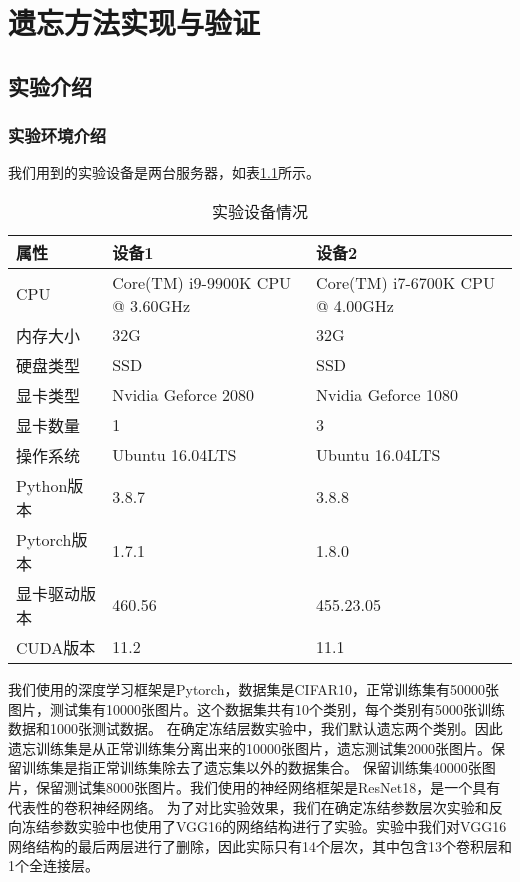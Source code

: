 
\chapter{遗忘方法实现与验证}

\section{实验介绍}

\subsection{实验环境介绍}
我们用到的实验设备是两台服务器，如表\ref{tab:experiment-deivce}所示。
\begin{table}
    \centering
    \caption{实验设备情况}
    \begin{tabular}{lll}
      \toprule
      属性  & 设备1 & 设备2  \\
      \midrule
      CPU   & Core(TM) i9-9900K CPU @ 3.60GHz & Core(TM) i7-6700K CPU @ 4.00GHz \\
      内存大小  & 32G & 32G                    \\
      硬盘类型 & SSD  & SSD  \\
      显卡类型 & Nvidia Geforce 2080  & Nvidia Geforce 1080  \\
      显卡数量 & 1  & 3  \\
      操作系统 & Ubuntu 16.04LTS  & Ubuntu 16.04LTS  \\
      Python版本 & 3.8.7  & 3.8.8  \\
      Pytorch版本 & 1.7.1  & 1.8.0  \\
      显卡驱动版本 & 460.56  & 455.23.05  \\
      CUDA版本 & 11.2  & 11.1  \\
      \bottomrule
    \end{tabular}
    \label{tab:experiment-deivce}
\end{table}

我们使用的深度学习框架是Pytorch，数据集是CIFAR10\cite{cifar10_2009}，正常训练集有50000张图片，测试集有10000张图片。这个数据集共有10个类别，每个类别有5000张训练数据和1000张测试数据。
在确定冻结层数实验中，我们默认遗忘两个类别。因此遗忘训练集是从正常训练集分离出来的10000张图片，遗忘测试集2000张图片。保留训练集是指正常训练集除去了遗忘集以外的数据集合。
保留训练集40000张图片，保留测试集8000张图片。我们使用的神经网络框架是ResNet18\cite{He_2016_CVPR}，是一个具有代表性的卷积神经网络。
为了对比实验效果，我们在确定冻结参数层次实验和反向冻结参数实验中也使用了VGG16\cite{Simonyan15}的网络结构进行了实验。实验中我们对VGG16网络结构的最后两层进行了删除，因此实际只有14个层次，其中包含13个卷积层和1个全连接层。

